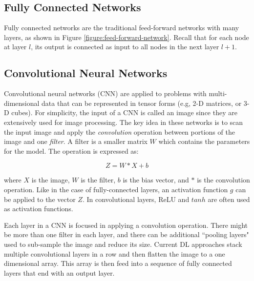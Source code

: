 \documentclass[12pt]{report}
\begin{document}
\subsection{Fully Connected Networks}

Fully connected networks are the traditional feed-forward networks with many layers, as shown in Figure \ref{figure:feed-forward-network}.
Recall that for each node at layer $l$, its output is connected as input to all nodes in the next layer $l+1$.


\subsection{Convolutional Neural Networks}
Convolutional neural networks (\ac{CNN}) are applied to problems with multi-dimensional data that can be represented in tensor forms (e.g, 2-D matrices, or 3-D 
cubes). For simplicity, the input of a \ac{CNN} is called an image since they are extensively used for image processing.  
The key idea in these networks is to scan the input image and apply the {\em convolution} operation between portions of the image and one {\em filter}. 
A filter is a smaller matrix $W$ which contains the parameters for the model. The operation is expressed as: 

\begin{equation}
Z = W*X + b
\end{equation}

where $X$ is the image, $W$ is the filter, $b$ is the bias vector, and $*$ is the convolution operation. Like in the case of fully-connected layers, an activation function $g$ can be applied to  the vector $Z$. In convolutional layers, \ac{ReLU} and $tanh$ are often used as activation functions. 

Each layer in a \ac{CNN} is focused in applying a convolution operation. 
There might be more than one filter in each layer, and there can be additional ``pooling layers" used to sub-sample the image and reduce its size. Current \ac{DL} approaches stack multiple convolutional layers in a row and then flatten the image to a one dimensional array. 
This array is then feed into a sequence 
of fully connected layers that end with an output layer. 
\end{document}
